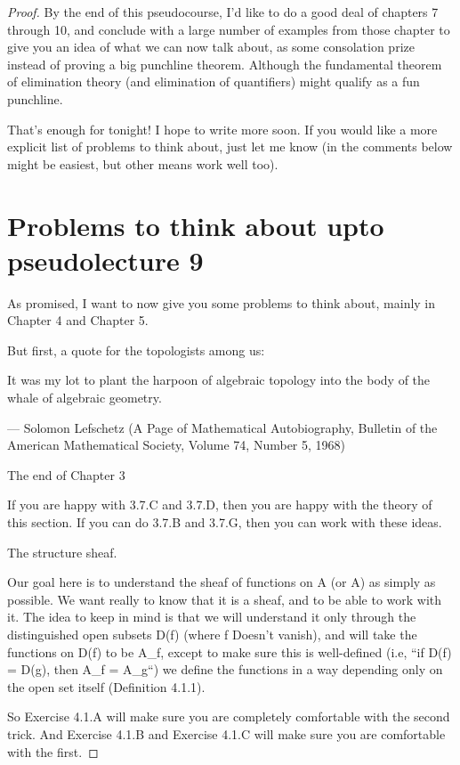 \documentclass{book}
\theoremstyle{definition}
\begin{document}
\begin{proof}
By the end of this pseudocourse, I’d like to do a good deal of chapters 7 through 10, and conclude with a large number of examples from those chapter to give you an idea of what we can now talk about, as some consolation prize instead of proving a big punchline theorem. Although the fundamental theorem of elimination theory (and elimination of quantifiers) might qualify as a fun punchline.

That’s enough for tonight! I hope to write more soon. If you would like a more explicit list of problems to think about, just let me know (in the comments below might be easiest, but other means work well too).

\chapter{Problems to think about upto pseudolecture 9}

As promised, I want to now give you some problems to think about, mainly in Chapter 4 and Chapter 5.

But first, a quote for the topologists among us:

It was my lot to plant the harpoon of algebraic topology into the body of the whale of algebraic geometry.

— Solomon Lefschetz (A Page of Mathematical Autobiography, Bulletin of the American Mathematical Society, Volume 74, Number 5, 1968)

The end of Chapter 3

If you are happy with 3.7.C and 3.7.D, then you are happy with the theory of this section. If you can do 3.7.B and 3.7.G, then you can work with these ideas.

The structure sheaf.

Our goal here is to understand the sheaf of functions on  \; A (or  \; A) as simply as possible. We want really to know that it is a sheaf, and to be able to work with it. The idea to keep in mind is that we will understand it only through the distinguished open subsets D(f) (where f Doesn’t vanish), and will take the functions on D(f) to be A_f, except to make sure this is well-defined (i.e, “if D(f) = D(g), then A_f = A_g“) we define the functions in a way depending only on the open set itself (Definition 4.1.1).

So Exercise 4.1.A will make sure you are completely comfortable with the second trick. And Exercise 4.1.B and Exercise 4.1.C will make sure you are comfortable with the first.


\end{proof}
\end{document}
